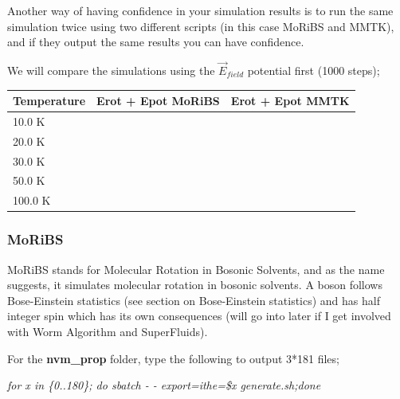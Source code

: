 \documentclass{article}
\begin{document}
Another way of having confidence in your simulation results is to run the same simulation twice using two different scripts (in this case MoRiBS and MMTK), and if they output the same results you can have confidence. 

We will compare the simulations using the \begin{math} \vec{E}_{field} \end{math} potential first (1000 steps);

\begin{center}
\begin{tabular*}{\textwidth}{ | p{} | p{}| p{}|}
\hline
\textbf{Temperature} & \textbf{Erot + Epot MoRiBS} & \textbf{Erot + Epot MMTK} \\ 
\hline 
10.0 K &  &  \\ 
\hline
20.0 K &  &  \\
\hline 
30.0 K &  &  \\ 
\hline 
50.0 K &  &  \\
\hline 
100.0 K &  &  \\
\hline 
\end{tabular*}
\end{center} 

\subsubsection{MoRiBS}

MoRiBS stands for Molecular Rotation in Bosonic Solvents, and as the name suggests, it simulates molecular rotation in bosonic solvents. A boson follows Bose-Einstein statistics (see section on Bose-Einstein statistics) and has half integer spin which has its own consequences (will go into later if I get involved with Worm Algorithm and SuperFluids). 



For the \textbf{nvm\_prop} folder, type the following to output 3*181 files;

\textit{for x in \{0..180\}; do sbatch  - - export=ithe=\$x generate.sh;done}
\end{document}
